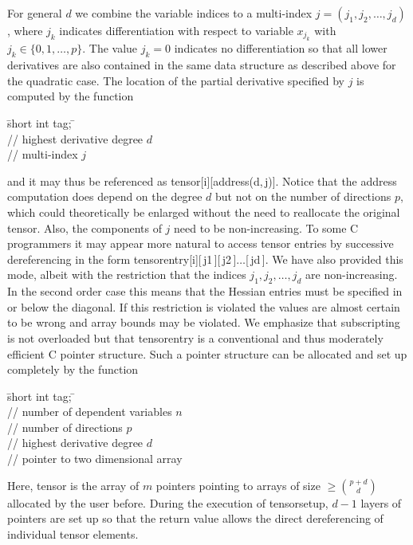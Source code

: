 \documentclass[11pt,twoside]{article}
\begin{document}
For general $d$ we combine the variable
indices to a multi-index $j = (j_1,j_2,\ldots,j_d)$, 
where $j_k$ indicates differentiation with respect to variable 
$x_{j_k}$ with $j_k \in \{0,1,\ldots,p\}$. The value $j_k=0$ indicates
no differentiation so that all lower derivatives are also 
contained in the same data structure as described above for 
the quadratic case. The location of the partial derivative specified 
by $j$ is computed by the function
%
\begin{tabbing}
\hspace{0.5in}\={\sf short int tag;} \hspace{1.1in}\= \kill    %
 \\
                 \> // highest derivative degree $d$ \\
              \> // multi-index $j$
\end{tabbing}       
%
and it may thus be referenced as {\sf tensor[i][address(d,$\,$j)]}.
Notice that the address computation does depend on the degree $d$ 
but not on the number of directions $p$, which could theoretically be
enlarged without the need to reallocate the original tensor. 
Also, the components of $j$ need to be non-increasing. 
% 
To some C programmers it may appear more natural to access tensor
entries by successive dereferencing in the form
{\sf tensorentry[i][$\,$j1$\,$][$\,$j2$\,$]$\ldots$[$\,$jd$\,$]}.
We have also provided this mode, albeit with the restriction 
that the indices $j_1,j_2,\ldots,j_d$ are non-increasing.
In the second order case this means that the Hessian entries must be
specified in or below the diagonal. If this restriction is 
violated the values are almost certain to be wrong and array bounds
may be violated. We emphasize that subscripting is not overloaded
but that {\sf tensorentry} is a conventional and 
thus moderately efficient C pointer structure. 
Such a pointer structure can be allocated and set up completely by the 
function
%
\begin{tabbing}
\hspace{0.5in}\={\sf short int tag;} \hspace{1.1in}\= \kill    %
 \\
                 \> // number of dependent variables $n$ \\
                 \> // number of directions $p$\\
                 \> // highest derivative degree $d$\\
\> // pointer to two dimensional array
\end{tabbing}      
%
Here, {\sf tensor} is the array of $m$ pointers pointing to arrays of {\sf size}
$\geq \binom{p+d}{d}$ allocated by the user before. During the execution of {\sf tensorsetup},
 $d-1$ layers of pointers are set up so that the return value 
allows the direct dereferencing of individual tensor elements.
\end{document}
